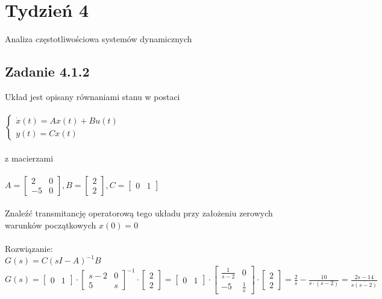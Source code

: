 
\pagebreak
\section*{Tydzień 4}
Analiza częstotliwościowa systemów dynamicznych
\subsection*{Zadanie 4.1.2} {\color{darkgray}
Układ jest opisany równaniami stanu w postaci\\\\
$\begin{cases} \dot{x}(t)=Ax(t)+Bu(t)\\y(t)=Cx(t)\end{cases}$\\\\
z macierzami\\\\
$A=\left[\begin{array}{cc}2&0\\-5&0\end{array}\right],
B=\left[\begin{array}{c}2\\2\end{array}\right],
C=\left[\begin{array}{cc}
0&1
\end{array}\right]
$\\\\
Znaleźć transmitancję operatorową tego układu przy założeniu zerowych warunków początkowych $x(0)=0$\\\\
Rozwiązanie:\\
$G(s)=C(sI-A)^{-1}B$\\
$G(s)=\left[\begin{array}{cc}0&1\end{array}\right]
\cdot
\left[\begin{array}{cc}{s-2}&0\\5&s\end{array}\right]^{-1}
\cdot
\left[\begin{array}{c}2\\2\end{array}\right]=\left[\begin{array}{cc}0&1\end{array}\right]
\cdot 
\left[\begin{array}{cc}{\frac{1}{s-2}}&0\\-5&\frac{1}{s}\end{array}\right]
\cdot
\left[\begin{array}{c}2\\2\end{array}\right]=\frac{2}{s}-\frac{10}{s\cdot(s-2)}=\frac{2s-14}{s\dot{(s-2)}}
$
\pagebreak
}

